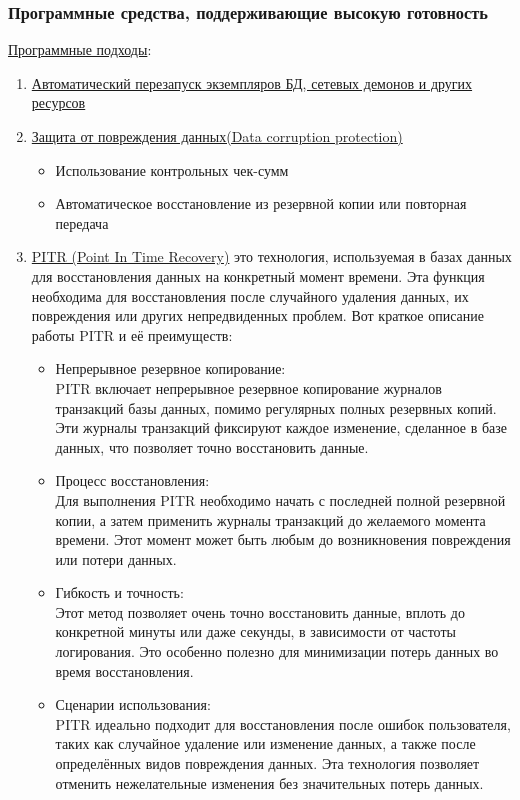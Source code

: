 \subsubsection{Программные средства, поддерживающие высокую готовность}
\underline{Программные подходы}:
\begin{enumerate}
    \item \underline{Автоматический перезапуск экземпляров БД, сетевых демонов и других ресурсов}
    \item \underline{Защита от повреждения данных(Data corruption protection)}
    \begin{itemize}
        \item Использование контрольных чек-сумм
        \item Автоматическое восстановление из резервной копии или повторная передача
    \end{itemize}
    \item \underline{PITR (Point In Time Recovery)} это технология, используемая в базах данных для восстановления данных на конкретный момент времени. Эта функция необходима для восстановления после случайного удаления данных, их повреждения или других непредвиденных проблем. Вот краткое описание работы PITR и её преимуществ:
    \begin{itemize}
        \item Непрерывное резервное копирование: \\
        PITR включает непрерывное резервное копирование журналов транзакций базы данных, помимо регулярных полных резервных копий. Эти журналы транзакций фиксируют каждое изменение, сделанное в базе данных, что позволяет точно восстановить данные.
        \item Процесс восстановления: \\
        Для выполнения PITR необходимо начать с последней полной резервной копии, а затем применить журналы транзакций до желаемого момента времени. Этот момент может быть любым до возникновения повреждения или потери данных.
        \item Гибкость и точность: \\
        Этот метод позволяет очень точно восстановить данные, вплоть до конкретной минуты или даже секунды, в зависимости от частоты логирования. Это особенно полезно для минимизации потерь данных во время восстановления.
        \item Сценарии использования: \\
        PITR идеально подходит для восстановления после ошибок пользователя, таких как случайное удаление или изменение данных, а также после определённых видов повреждения данных. Эта технология позволяет отменить нежелательные изменения без значительных потерь данных.

\end{itemize}
\end{enumerate}
